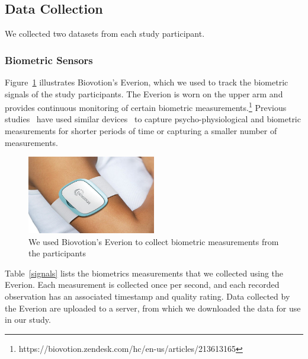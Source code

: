 \subsection{Data Collection}
\label{sec:DataCol}
We collected two datasets  from each study participant.

\subsubsection{Biometric Sensors}
Figure~\ref{everion} illustrates Biovotion's Everion, which we used to track the biometric signals of the study participants. The Everion is worn on the upper arm and provides continuous monitoring of certain biometric measurements.\footnote{https://biovotion.zendesk.com/hc/en-us/articles/213613165} Previous studies~\cite{zuger18,sano2013stress,healey2005detecting,wijsman2011towards,zuger2015interruptibility,goyal2017intelligent} have used similar devices~\cite{Okada11,polar,fitbitCharge} to capture psycho-physiological and biometric measurements for shorter periods of time or capturing a smaller number of measurements.

\begin{figure}
  \centering
      \includegraphics[width=0.5\textwidth]{Everion.jpg}
  \caption{We used Biovotion's Everion to collect biometric measurements from the participants}
   \label{everion}
\end{figure}

Table~\ref{signals} lists the biometrics measurements that we collected using the Everion. Each measurement is collected once per second, and each recorded observation has an associated timestamp and quality rating. Data collected by the Everion are uploaded to a server, from which we downloaded the data for use in our study.  



